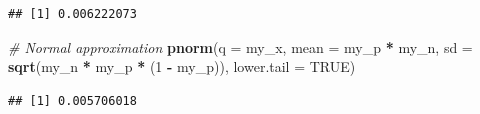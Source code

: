 \documentclass[]{book}
\newenvironment{Shaded}{\begin{snugshade}}{\end{snugshade}}
\newcommand{\CommentTok}[1]{\textcolor[rgb]{0.56,0.35,0.01}{\textit{#1}}}
\newcommand{\DataTypeTok}[1]{\textcolor[rgb]{0.13,0.29,0.53}{#1}}
\newcommand{\DecValTok}[1]{\textcolor[rgb]{0.00,0.00,0.81}{#1}}
\newcommand{\KeywordTok}[1]{\textcolor[rgb]{0.13,0.29,0.53}{\textbf{#1}}}
\newcommand{\NormalTok}[1]{#1}
\newcommand{\OperatorTok}[1]{\textcolor[rgb]{0.81,0.36,0.00}{\textbf{#1}}}
\newcommand{\OtherTok}[1]{\textcolor[rgb]{0.56,0.35,0.01}{#1}}
\newcommand{\StringTok}[1]{\textcolor[rgb]{0.31,0.60,0.02}{#1}}
\begin{document}
\begin{verbatim}
## [1] 0.006222073
\end{verbatim}

\begin{Shaded}
\begin{Highlighting}[]
\CommentTok{# Normal approximation}
\KeywordTok{pnorm}\NormalTok{(}\DataTypeTok{q =}\NormalTok{ my_x, }\DataTypeTok{mean =}\NormalTok{ my_p }\OperatorTok{*}\StringTok{ }\NormalTok{my_n, }\DataTypeTok{sd =} \KeywordTok{sqrt}\NormalTok{(my_n }\OperatorTok{*}\StringTok{ }\NormalTok{my_p }\OperatorTok{*}\StringTok{ }\NormalTok{(}\DecValTok{1} \OperatorTok{-}\StringTok{ }\NormalTok{my_p)), }\DataTypeTok{lower.tail =} \OtherTok{TRUE}\NormalTok{)}
\end{Highlighting}
\end{Shaded}

\begin{verbatim}
## [1] 0.005706018
\end{verbatim}
\end{document}
